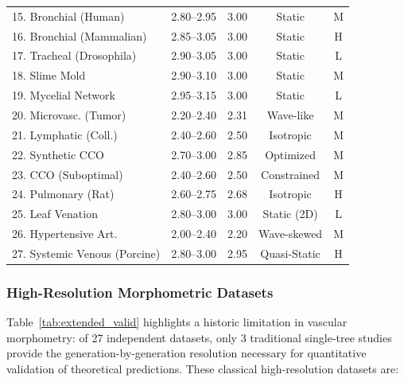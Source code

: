 \documentclass[11pt,a4paper]{article}
\theoremstyle{remark}
\begin{document}
\begin{table}[H]
\begin{tabular*}{\textwidth}{@{\extracolsep{\fill}} l c c c c @{}}
15. Bronchial (Human) \cite{horsfield1971}  & 2.80--2.95 & 3.00 & Static & M \\
16. Bronchial (Mammalian) \cite{mederacke2025} & 2.85--3.05 & 3.00 & Static & H \\
17. Tracheal (Drosophila) \cite{ghabrial2003}& 2.90--3.05 & 3.00 & Static & L \\
18. Slime Mold \cite{tero2010}              & 2.90--3.10 & 3.00 & Static & M \\
19. Mycelial Network \cite{heaton2012}      & 2.95--3.15 & 3.00 & Static & L \\
20. Microvasc. (Tumor) \cite{baish1996,stolz2022}     & 2.20--2.40 & 2.31 & Wave-like & M \\
21. Lymphatic (Coll.) \cite{bertram2011}    & 2.40--2.60 & 2.50 & Isotropic & M \\
22. Synthetic CCO \cite{schreiner1993}      & 2.70--3.00 & 2.85 & Optimized & M \\
23. CCO (Suboptimal) \cite{karch1999}       & 2.40--2.60 & 2.50 & Constrained & M \\
24. Pulmonary (Rat) \cite{jiang1994}        & 2.60--2.75 & 2.68 & Isotropic & H \\
25. Leaf Venation \cite{price2007}          & 2.80--3.00 & 3.00 & Static (2D) & L \\
26. Hypertensive Art. \cite{laurent2006}    & 2.00--2.40 & 2.20 & Wave-skewed & M \\
27. Systemic Venous (Porcine) \cite{kassab1994}        & 2.80--3.00 & 2.95 & Quasi-Static & H \\
\bottomrule\end{tabular*}

\end{table}

\subsubsection{High-Resolution Morphometric Datasets}

Table~\ref{tab:extended_valid} highlights a historic limitation in vascular
morphometry: of 27 independent datasets, only 3 traditional single-tree studies
provide the generation-by-generation resolution necessary for quantitative
validation of theoretical predictions. These classical high-resolution datasets
are:
\end{document}
